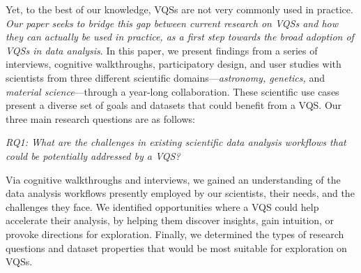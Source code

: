 

Yet, to the best of our knowledge, 
VQSs are not very commonly used in practice.
{\em Our paper seeks to bridge this gap between current research on VQSs and how they can actually be used in practice, as a first step towards the broad adoption of VQSs in data analysis}. 
In this paper, we present findings from a series of interviews, cognitive walkthroughs, participatory design, and user studies with scientists from three different scientific 
domains---{\em astronomy, genetics,} and {\em material science}---through a year-long collaboration.
These scientific use cases present a diverse set of goals and datasets that could benefit from a VQS. Our three main research questions are as follows:


\emph{RQ1: What are the challenges in existing scientific data analysis workflows that could be potentially addressed by a VQS?}

Via cognitive walkthroughs and interviews,
we gained an understanding of the data analysis 
workflows presently employed by our scientists, their needs,
and the challenges they face. 
We identified opportunities where a VQS could
help accelerate their analysis, by helping them
discover insights, gain intuition, or provoke directions
for exploration. Finally, we determined the types of 
research questions and dataset properties that would
be most suitable for exploration on VQSs.

